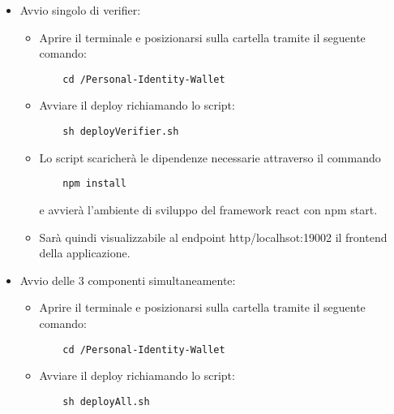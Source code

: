 \begin{itemize}
\item Avvio singolo di verifier:
\begin{itemize}
\item Aprire il terminale e posizionarsi sulla cartella tramite il seguente comando: 
\begin{verbatim}
    cd /Personal-Identity-Wallet
\end{verbatim}
\item Avviare il deploy richiamando lo script: 
\begin{verbatim}
    sh deployVerifier.sh
\end{verbatim}
\item Lo script scaricherà le dipendenze necessarie attraverso il commando 
\begin{verbatim}
    npm install
\end{verbatim}
 e avvierà l’ambiente di sviluppo del framework react con npm start.
\item Sarà quindi visualizzabile al endpoint http/localhsot:19002 il frontend della applicazione.
\end{itemize}

\item Avvio delle 3 componenti simultaneamente:
\begin{itemize}
\item Aprire il terminale e posizionarsi sulla cartella tramite il seguente comando: 
\begin{verbatim}
    cd /Personal-Identity-Wallet
\end{verbatim}
\item Avviare il deploy richiamando lo script: 
\begin{verbatim}
    sh deployAll.sh
\end{verbatim}
\end{itemize}
\end{itemize}

